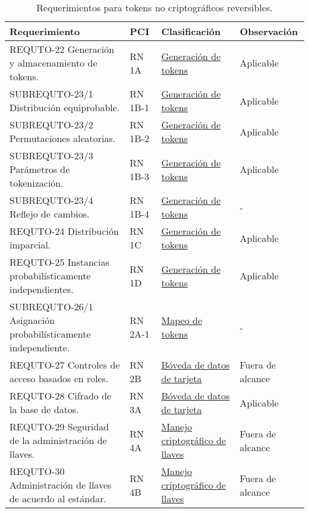 \begin{table}[H]
  \centering
  \begin{tabular}{| p{5.5cm} | p{2cm} | p{4cm} | p{4cm} |}

    \hline
      \textbf{Requerimiento}    &
      \textbf{PCI}              &
      \textbf{Clasificación}    &
      \textbf{Observación}     \\ [0.8ex]
    \hline

    REQUTO-22 Generación y almacenamiento de tokens.  
    &  RN 1A    &  \hyperref[dm:gen_tokens]{Generación de tokens}              &  Aplicable        \\ \hline
    SUBREQUTO-23/1 Distribución equiprobable.  
    &  RN 1B-1  &  \hyperref[dm:gen_tokens]{Generación de tokens}              &  Aplicable        \\ \hline
    SUBREQUTO-23/2 Permutaciones aleatorias.  
    &  RN 1B-2  &  \hyperref[dm:gen_tokens]{Generación de tokens}              &  Aplicable        \\ \hline
    SUBREQUTO-23/3 Parámetros de tokenización.  
    &  RN 1B-3  &  \hyperref[dm:gen_tokens]{Generación de tokens}              &  Aplicable        \\ \hline
    SUBREQUTO-23/4 Reflejo de cambios.  
    &  RN 1B-4  &  \hyperref[dm:gen_tokens]{Generación de tokens}              &  -                \\ \hline
    REQUTO-24 Distribución imparcial.  
    &  RN 1C    &  \hyperref[dm:gen_tokens]{Generación de tokens}              &  Aplicable        \\ \hline
    REQUTO-25 Instancias probabilísticamente independientes.  
    &  RN 1D    &  \hyperref[dm:gen_tokens]{Generación de tokens}              &  Aplicable        \\ \hline
    SUBREQUTO-26/1 Asignación probabilísticamente independiente.  
    &  RN 2A-1  &  \hyperref[dm:mapeo_tokens]{Mapeo de tokens}                 &  -                \\ \hline
    REQUTO-27 Controles de acceso basados en roles.  
    &  RN 2B    &  \hyperref[dm:card_data]{Bóveda de datos de tarjeta}         &  Fuera de alcance \\ \hline
    REQUTO-28 Cifrado de la base de datos.  
    &  RN 3A    &  \hyperref[dm:card_data]{Bóveda de datos de tarjeta}         &  Aplicable        \\ \hline
    REQUTO-29 Seguridad de la administración de llaves.  
    &  RN 4A    &  \hyperref[dm:man_llaves]{Manejo criptográfico de llaves}    &  Fuera de alcance \\ \hline
    REQUTO-30 Administración de llaves de acuerdo al estándar.  
    &  RN 4B    &  \hyperref[dm:man_llaves]{Manejo criptográfico de llaves}    &  Fuera de alcance \\ \hline

  \end{tabular}
  \caption{Requerimientos para tokens no criptográficos reversibles.}
\end{table}

